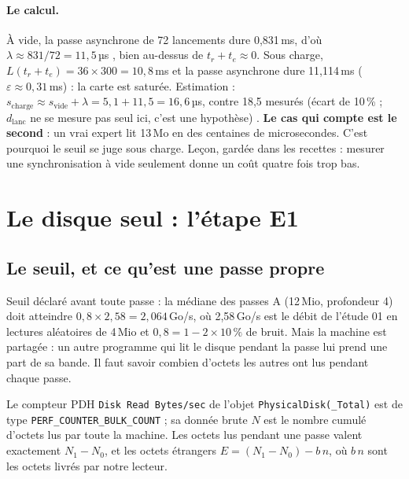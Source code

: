 \paragraph{Le calcul.} À vide, la passe asynchrone de 72 lancements dure 0,831\,ms, d'où $\lambda \approx 831/72 = 11{,}5$\,µs \mes, bien au-dessus de $t_r + t_e \approx 0$. Sous charge, $L(t_r + t_e) = 36 \times 300 = 10{,}8$\,ms et la passe asynchrone dure 11,114\,ms ($\varepsilon \approx 0{,}31$\,ms) : la carte est saturée. Estimation : $s_{\mathrm{charge}} \approx s_{\mathrm{vide}} + \lambda = 5{,}1 + 11{,}5 = 16{,}6$\,µs, contre 18,5 mesurés (écart de 10\,\% ; $d_{\mathrm{lanc}}$ ne se mesure pas seul ici, c'est une hypothèse) \calc. \textbf{Le cas qui compte est le second} : un vrai expert lit 13\,Mo en des centaines de microsecondes. C'est pourquoi le seuil se juge sous charge. Leçon, gardée dans les recettes : mesurer une synchronisation à vide seulement donne un coût quatre fois trop bas.

\section{Le disque seul : l'étape E1}\label{sec:t2c-disque}

\subsection{Le seuil, et ce qu'est une passe propre}

Seuil déclaré avant toute passe : la médiane des passes A (12\,Mio, profondeur 4) doit atteindre $0{,}8 \times 2{,}58 = 2{,}064$\,Go/s, où 2,58\,Go/s est le débit de l'étude 01 en lectures aléatoires de 4\,Mio et $0{,}8 = 1 - 2 \times 10\,\%$ de bruit. Mais la machine est partagée : un autre programme qui lit le disque pendant la passe lui prend une part de sa bande. Il faut savoir combien d'octets les autres ont lus pendant chaque passe.

\begin{lemme}\label{lem:t2c-pdh}
Le compteur PDH \texttt{Disk Read Bytes/\allowbreak sec} de l'objet \texttt{PhysicalDisk(\_Total)} est de type \texttt{PERF\_COUNTER\_BULK\_COUNT} ; sa donnée brute $N$ est le nombre cumulé d'octets lus par toute la machine. Les octets lus pendant une passe valent exactement $N_1 - N_0$, et les octets étrangers $E = (N_1 - N_0) - b\,n$, où $b\,n$ sont les octets livrés par notre lecteur.
\end{lemme}

